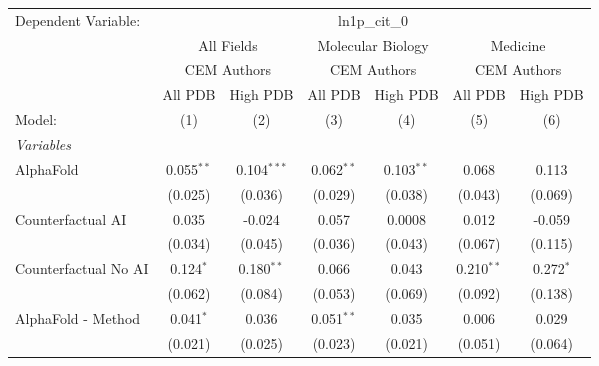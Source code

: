 \begingroup
\centering
\begin{tabular}{lcccccc}
   \tabularnewline \midrule \midrule
   Dependent Variable: & \multicolumn{6}{c}{ln1p\_cit\_0}\\
 & \multicolumn{2}{c}{All Fields} & \multicolumn{2}{c}{Molecular Biology} & \multicolumn{2}{c}{Medicine} \\
\cmidrule(lr){2-3} \cmidrule(lr){4-5} \cmidrule(lr){6-7}
 & \multicolumn{2}{c}{CEM Authors} & \multicolumn{2}{c}{CEM Authors} & \multicolumn{2}{c}{CEM Authors} \\
\cmidrule(lr){2-3} \cmidrule(lr){4-5} \cmidrule(lr){6-7}
 & \multicolumn{1}{c}{All PDB} & \multicolumn{1}{c}{High PDB} & \multicolumn{1}{c}{All PDB} & \multicolumn{1}{c}{High PDB} & \multicolumn{1}{c}{All PDB} & \multicolumn{1}{c}{High PDB} \\
\cmidrule(lr){2-2} \cmidrule(lr){3-3} \cmidrule(lr){4-4} \cmidrule(lr){5-5} \cmidrule(lr){6-6} \cmidrule(lr){7-7}
   Model:                                                     & (1)          & (2)           & (3)          & (4)          & (5)          & (6)\\  
   \midrule
   \emph{Variables}\\
   AlphaFold                                                  & 0.055$^{**}$ & 0.104$^{***}$ & 0.062$^{**}$ & 0.103$^{**}$ & 0.068        & 0.113\\   
                                                              & (0.025)      & (0.036)       & (0.029)      & (0.038)      & (0.043)      & (0.069)\\   
   Counterfactual AI                                          & 0.035        & -0.024        & 0.057        & 0.0008       & 0.012        & -0.059\\   
                                                              & (0.034)      & (0.045)       & (0.036)      & (0.043)      & (0.067)      & (0.115)\\   
   Counterfactual No AI                                       & 0.124$^{*}$  & 0.180$^{**}$  & 0.066        & 0.043        & 0.210$^{**}$ & 0.272$^{*}$\\   
                                                              & (0.062)      & (0.084)       & (0.053)      & (0.069)      & (0.092)      & (0.138)\\   
   AlphaFold - Method                                         & 0.041$^{*}$  & 0.036         & 0.051$^{**}$ & 0.035        & 0.006        & 0.029\\   
                                                              & (0.021)      & (0.025)       & (0.023)      & (0.021)      & (0.051)      & (0.064)\\   

\end{tabular}

